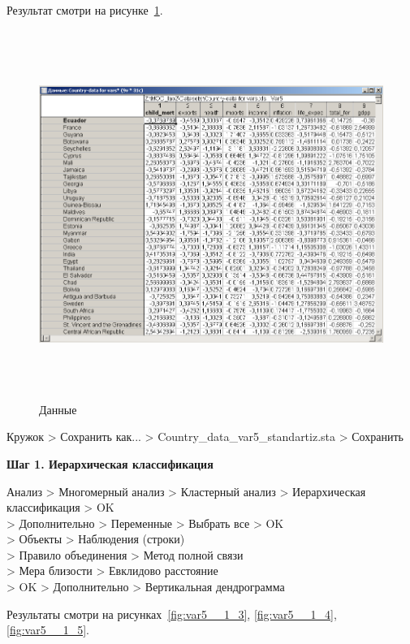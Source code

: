 Результат смотри на рисунке~\ref{fig:var5__1_2}.

\begin{figure}[!h]
  \centering

  \includegraphics[height=12cm]
  {inc/cars_my/var5__1_2.PNG}

  \caption{Данные}

  \label{fig:var5__1_2}
\end{figure}

Кружок > Сохранить как... > Country\_data\_var5\_standartiz.sta > Сохранить

\newpage

\begin{center}
  \textbf{Шаг 1. Иерархическая классификация}
\end{center}

Анализ > Многомерный анализ > Кластерный анализ > Иерархическая классификация > OK \\
> Дополнительно > Переменные > Выбрать все > OK \\
> Объекты > Наблюдения (строки) \\
> Правило объединения > Метод полной связи \\
> Мера близости > Евклидово расстояние \\
> OK > Дополнительно > Вертикальная дендрограмма

Результаты смотри на рисунках~\ref{fig:var5__1_3}, \ref{fig:var5__1_4}, \ref{fig:var5__1_5}.

